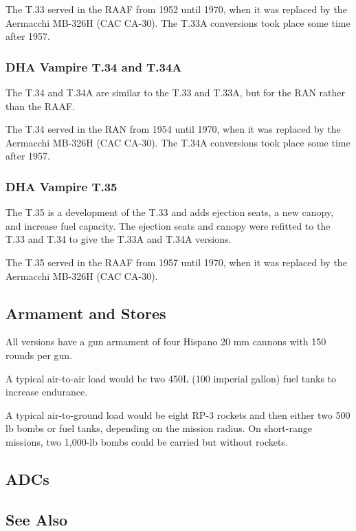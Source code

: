 The T.33 served in the RAAF from 1952 until 1970, when it was replaced by the Aermacchi MB-326H (CAC CA-30). The T.33A conversions took place some time after 1957.

\subsubsection{DHA Vampire T.34 and T.34A}

The T.34 and T.34A are similar to the T.33 and T.33A, but for the RAN rather than the RAAF.

The T.34 served in the RAN from 1954 until 1970, when it was replaced by the Aermacchi MB-326H (CAC CA-30). The T.34A conversions took place some time after 1957.

\subsubsection{DHA Vampire T.35}

The T.35 is a development of the T.33 and adds ejection seats, a new canopy, and increase fuel capacity. The ejection seats and canopy were refitted to the T.33 and T.34 to give the T.33A and T.34A versions.

The T.35 served in the RAAF from 1957 until 1970, when it was replaced by the Aermacchi MB-326H (CAC CA-30).

\subsection{Armament and Stores}

All versions have a gun armament of four Hispano 20 mm cannons with 150 rounds per gun. 

A typical air-to-air load would be two 450L (100 imperial gallon) fuel tanks to increase endurance. 

A typical air-to-ground load would be eight RP-3 rockets and then either two 500 lb bombs or fuel tanks, depending on the mission radius. On short-range missions, two 1,000-lb bombs could be carried but without rockets.

\subsection{ADCs}

\begin{adclist}
\end{adclist}

\subsection{See Also}

\begin{typelist}
\end{typelist}